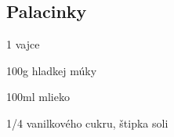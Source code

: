 \setcounter{step}{0}
\subsection{Palacinky}

\begin{ingredient}
\begin{main}
	\item 1 vajce
	\item 100g hladkej múky
	\item 100ml mlieko
	\item 1/4 vanilkového cukru, štipka soli
\end{main}
\end{ingredient}%
\begin{recipe}




\end{recipe}

\begin{notes}

\end{notes}	